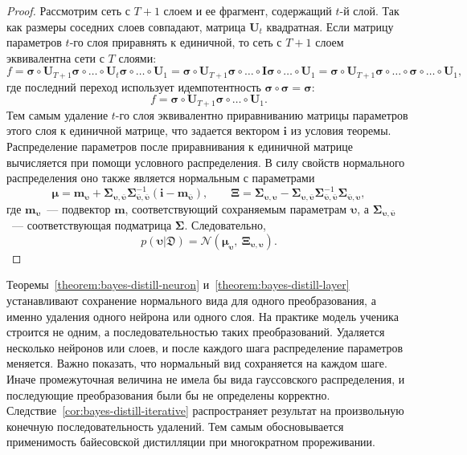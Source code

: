 \begin{proof}
Рассмотрим сеть с $T+1$ слоем и ее фрагмент, содержащий $t$-й слой. Так как размеры соседних слоев совпадают, матрица $\mathbf{U}_t$ квадратная. Если матрицу параметров $t$-го слоя приравнять к единичной, то сеть с $T+1$ слоем эквивалентна сети с $T$ слоями:
\[
    f = \boldsymbol{\sigma}\circ\mathbf{U}_{T+1}\boldsymbol{\sigma}\circ\ldots\circ\mathbf{U}_t\boldsymbol{\sigma}\circ\ldots\circ\mathbf{U}_1
    =
    \boldsymbol{\sigma}\circ\mathbf{U}_{T+1}\boldsymbol{\sigma}\circ\ldots\circ\mathbf{I}\boldsymbol{\sigma}\circ\ldots\circ\mathbf{U}_1
    =
    \boldsymbol{\sigma}\circ\mathbf{U}_{T+1}\boldsymbol{\sigma}\circ\ldots\circ\boldsymbol{\sigma}\circ\ldots\circ\mathbf{U}_1,
\]
где последний переход использует идемпотентность $\boldsymbol{\sigma}\circ\boldsymbol{\sigma}=\boldsymbol{\sigma}$:
\[
    f = \boldsymbol{\sigma}\circ\mathbf{U}_{T+1}\boldsymbol{\sigma}\circ\ldots\circ\mathbf{U}_1.
\]
Тем самым удаление $t$-го слоя эквивалентно приравниванию матрицы параметров этого слоя к единичной матрице, что задается вектором $\mathbf{i}$ из условия теоремы. Распределение параметров после приравнивания к единичной матрице вычисляется при помощи условного распределения. В силу свойств нормального распределения оно также является нормальным с параметрами
\[
    \boldsymbol{\mu}
    =
    \mathbf{m}_{\boldsymbol{\upsilon}}
    +
    \boldsymbol{\Sigma}_{\boldsymbol{\upsilon},\bar{\boldsymbol{\upsilon}}}
    \boldsymbol{\Sigma}_{\bar{\boldsymbol{\upsilon}},\bar{\boldsymbol{\upsilon}}}^{-1}
    (\mathbf{i}-\mathbf{m}_{\bar{\boldsymbol{\upsilon}}}),
    \qquad
    \boldsymbol{\Xi}
    =
    \boldsymbol{\Sigma}_{\boldsymbol{\upsilon},\boldsymbol{\upsilon}}
    -
    \boldsymbol{\Sigma}_{\boldsymbol{\upsilon},\bar{\boldsymbol{\upsilon}}}
    \boldsymbol{\Sigma}_{\bar{\boldsymbol{\upsilon}},\bar{\boldsymbol{\upsilon}}}^{-1}
    \boldsymbol{\Sigma}_{\bar{\boldsymbol{\upsilon}},\boldsymbol{\upsilon}},
\]
где $\mathbf{m}_{\boldsymbol{\upsilon}}$~--- подвектор $\mathbf{m}$, соответствующий сохраняемым параметрам $\boldsymbol{\upsilon}$, а $\boldsymbol{\Sigma}_{\boldsymbol{\upsilon},\bar{\boldsymbol{\upsilon}}}$~--- соответствующая подматрица $\boldsymbol{\Sigma}$. Следовательно,
\[
    p(\boldsymbol{\upsilon}|\mathfrak{D})
    =
    \mathcal{N}(\boldsymbol{\mu}_{\boldsymbol{\upsilon}},\ \boldsymbol{\Xi}_{\boldsymbol{\upsilon},\boldsymbol{\upsilon}}).
\]
\end{proof}

Теоремы~\ref{theorem:bayes-distill-neuron} и~\ref{theorem:bayes-distill-layer} устанавливают сохранение нормального вида для одного преобразования, а именно удаления одного нейрона или одного слоя.
На практике модель ученика строится не одним, а последовательностью таких преобразований.
Удаляется несколько нейронов или слоев, и после каждого шага распределение параметров меняется.
Важно показать, что нормальный вид сохраняется на каждом шаге.
Иначе промежуточная величина не имела бы вида гауссовского распределения, и последующие преобразования были бы не определены корректно.
Следствие~\ref{cor:bayes-distill-iterative} распространяет результат на произвольную конечную последовательность удалений.
Тем самым обосновывается применимость байесовской дистилляции при многократном прореживании.


